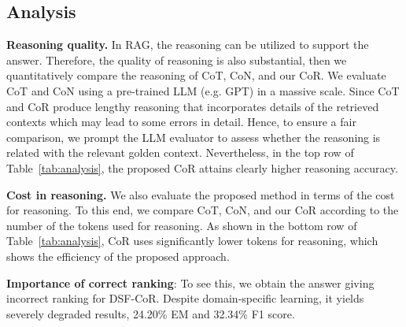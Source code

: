 \subsection{Analysis}
\noindent \textbf{Reasoning quality.}
In RAG, the reasoning can be utilized to support the answer. Therefore, the quality of reasoning is also substantial, then we quantitatively compare the reasoning of CoT, CoN, and our CoR. We evaluate CoT and CoN using a pre-trained LLM (e.g. GPT) in a massive scale. Since CoT and CoR produce lengthy reasoning that incorporates details of the retrieved contexts which may lead to some errors in detail. Hence, to ensure a fair comparison, we prompt the LLM evaluator to assess whether the reasoning is related with the relevant golden context. Nevertheless, in the top row of Table~\ref{tab:analysis}, the proposed CoR attains clearly higher reasoning accuracy.

\noindent \textbf{Cost in reasoning.} We also evaluate the proposed method in terms of the cost for reasoning. To this end, we compare CoT, CoN, and our CoR according to the number of the tokens used for reasoning. As shown in the bottom row of Table~\ref{tab:analysis}, CoR uses significantly lower tokens for reasoning, which shows the efficiency of the proposed approach.

\noindent \textbf{Importance of correct ranking}: To see this, we obtain the answer giving incorrect ranking for DSF-CoR. Despite domain-specific learning, it yields severely degraded results, 24.20\% EM and 32.34\% F1 score. 





